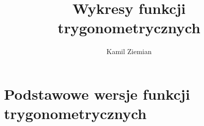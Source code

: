 \documentclass[a4paper,11pt]{article}
\title{Wykresy funkcji trygonometrycznych}
\author{Kamil Ziemian}
\numberwithin{equation}{section}
\begin{document}





\maketitle




















\section{Podstawowe wersje funkcji trygonometrycznych}

\label{sec:Podstawowe-wersje-funkcji-trygonometyrcznych}
\end{document}
